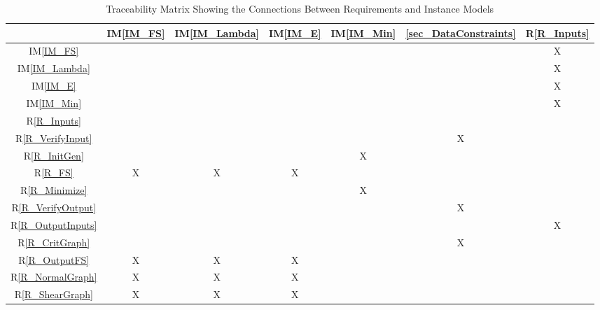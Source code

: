 \documentclass[12pt]{article}
\newcommand{\tref}[1]{T\ref{#1}}
\newcommand{\iref}[1]{IM\ref{#1}}
\newcommand{\ddref}[1]{DD\ref{#1}}
\newcommand{\dref}[1]{GD\ref{#1}}
\newcommand{\rref}[1]{R\ref{#1}}
\begin{document}
\begin{table}[h!]
\centering
\begin{tabular}{|c|c|c|c|c|c|c|}
\hline
& \iref{IM_FS}& \iref{IM_Lambda}& \iref{IM_E}& \iref{IM_Min}& 
\ref{sec_DataConstraints} & \rref{R_Inputs}\\
\hline
\iref{IM_FS}          & & & & & & X\\ \hline
\iref{IM_Lambda}      & & & & & & X\\ \hline
\iref{IM_E}           & & & & & & X\\ \hline
\iref{IM_Min}         & & & & & & X\\ \hline 
\rref{R_Inputs}       & & & & & & \\ \hline
\rref{R_VerifyInput}  & & & & & X& \\ \hline
\rref{R_InitGen}      & & & & X& & \\ \hline
\rref{R_FS}           & X& X& X& & & \\ \hline 
\rref{R_Minimize}     & & & & X& & \\ \hline
\rref{R_VerifyOutput} & & & & & X& \\ \hline
\rref{R_OutputInputs} & & & & & & X \\ \hline
\rref{R_CritGraph}    & & & & & X& \\ \hline
\rref{R_OutputFS}     & X& X& X& & & \\ \hline
\rref{R_NormalGraph}  & X& X& X& & & \\ \hline
\rref{R_ShearGraph}   & X& X& X& & & \\
\hline
\end{tabular}
\caption{Traceability Matrix Showing the Connections Between Requirements and 
Instance Models}
\label{Table:R_trace}
\end{table}
%
%
%			
\end{document}
